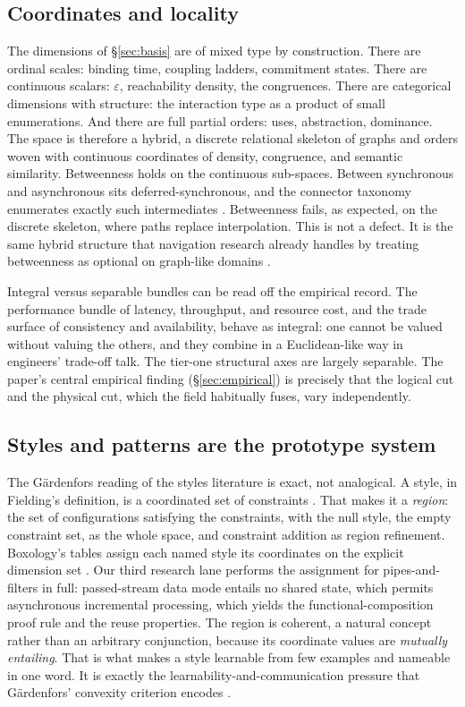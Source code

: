 \documentclass[11pt,oneside]{article}
\theoremstyle{definition}
\begin{document}
\subsection{Coordinates and locality}

The dimensions of \S\ref{sec:basis} are of mixed type by construction. There are ordinal scales:
binding time, coupling ladders, commitment states. There are continuous scalars: $\varepsilon$,
reachability density, the congruences. There are categorical dimensions with structure: the
interaction type as a product of small enumerations. And there are full partial orders: uses,
abstraction, dominance. The space is therefore a hybrid, a discrete relational skeleton of
graphs and orders woven with continuous coordinates of density, congruence, and semantic
similarity. Betweenness holds on the continuous sub-spaces. Between synchronous and asynchronous
sits deferred-synchronous, and the connector taxonomy enumerates exactly such intermediates
\cite{mehta2000}. Betweenness fails, as expected, on the discrete skeleton, where paths replace
interpolation. This is not a defect. It is the same hybrid structure that navigation research
already handles by treating betweenness as optional on graph-like domains \cite{behrens2018}.

Integral versus separable bundles can be read off the empirical record. The performance bundle
of latency, throughput, and resource cost, and the trade surface of consistency and
availability, behave as integral: one cannot be valued without valuing the others, and they
combine in a Euclidean-like way in engineers' trade-off talk. The tier-one structural axes are
largely separable. The paper's central empirical finding (\S\ref{sec:empirical}) is precisely
that the logical cut and the physical cut, which the field habitually fuses, vary independently.

\subsection{Styles and patterns are the prototype system}\label{sec:prototypes}

The G\"ardenfors reading of the styles literature is exact, not analogical. A style, in
Fielding's definition, is a coordinated set of constraints \cite{fielding2000}. That makes it a
\emph{region}: the set of configurations satisfying the constraints, with the null style, the
empty constraint set, as the whole space, and constraint addition as region refinement.
Boxology's tables assign each named style its coordinates on the explicit dimension set
\cite{boxology1997}. Our third research lane performs the assignment for pipes-and-filters in
full: passed-stream data mode entails no shared state, which permits asynchronous incremental
processing, which yields the functional-composition proof rule and the reuse properties. The
region is coherent, a natural concept rather than an arbitrary conjunction, because its
coordinate values are \emph{mutually entailing}. That is what makes a style learnable from few
examples and nameable in one word. It is exactly the learnability-and-communication pressure
that G\"ardenfors' convexity criterion encodes \cite{gardenfors2000,jager2007}.
\end{document}
